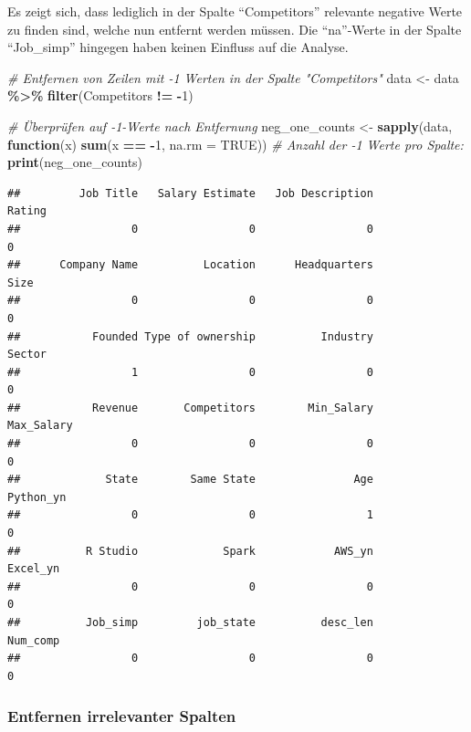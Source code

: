\documentclass[
]{article}
\newenvironment{Shaded}{\begin{snugshade}}{\end{snugshade}}
\newcommand{\AttributeTok}[1]{\textcolor[rgb]{0.13,0.29,0.53}{#1}}
\newcommand{\CommentTok}[1]{\textcolor[rgb]{0.56,0.35,0.01}{\textit{#1}}}
\newcommand{\ConstantTok}[1]{\textcolor[rgb]{0.56,0.35,0.01}{#1}}
\newcommand{\ControlFlowTok}[1]{\textcolor[rgb]{0.13,0.29,0.53}{\textbf{#1}}}
\newcommand{\DecValTok}[1]{\textcolor[rgb]{0.00,0.00,0.81}{#1}}
\newcommand{\FunctionTok}[1]{\textcolor[rgb]{0.13,0.29,0.53}{\textbf{#1}}}
\newcommand{\NormalTok}[1]{#1}
\newcommand{\OtherTok}[1]{\textcolor[rgb]{0.56,0.35,0.01}{#1}}
\newcommand{\SpecialCharTok}[1]{\textcolor[rgb]{0.81,0.36,0.00}{\textbf{#1}}}
\begin{document}
Es zeigt sich, dass lediglich in der Spalte ``Competitors'' relevante
negative Werte zu finden sind, welche nun entfernt werden müssen. Die
``na''-Werte in der Spalte ``Job\_simp'' hingegen haben keinen Einfluss
auf die Analyse.

\begin{Shaded}
\begin{Highlighting}[]
\CommentTok{\# Entfernen von Zeilen mit {-}1 Werten in der Spalte "Competitors"}
\NormalTok{data }\OtherTok{\textless{}{-}}\NormalTok{ data }\SpecialCharTok{\%\textgreater{}\%}
  \FunctionTok{filter}\NormalTok{(Competitors }\SpecialCharTok{!=} \SpecialCharTok{{-}}\DecValTok{1}\NormalTok{)}

\CommentTok{\# Überprüfen auf {-}1{-}Werte nach Entfernung}
\NormalTok{neg\_one\_counts }\OtherTok{\textless{}{-}} \FunctionTok{sapply}\NormalTok{(data, }\ControlFlowTok{function}\NormalTok{(x) }\FunctionTok{sum}\NormalTok{(x }\SpecialCharTok{==} \SpecialCharTok{{-}}\DecValTok{1}\NormalTok{, }\AttributeTok{na.rm =} \ConstantTok{TRUE}\NormalTok{))}
\CommentTok{\# Anzahl der {-}1 Werte pro Spalte:}
\FunctionTok{print}\NormalTok{(neg\_one\_counts)}
\end{Highlighting}
\end{Shaded}

\begin{verbatim}
##         Job Title   Salary Estimate   Job Description            Rating 
##                 0                 0                 0                 0 
##      Company Name          Location      Headquarters              Size 
##                 0                 0                 0                 0 
##           Founded Type of ownership          Industry            Sector 
##                 1                 0                 0                 0 
##           Revenue       Competitors        Min_Salary        Max_Salary 
##                 0                 0                 0                 0 
##             State        Same State               Age         Python_yn 
##                 0                 0                 1                 0 
##          R Studio             Spark            AWS_yn          Excel_yn 
##                 0                 0                 0                 0 
##          Job_simp         job_state          desc_len          Num_comp 
##                 0                 0                 0                 0
\end{verbatim}

\subsubsection{Entfernen irrelevanter
Spalten}\label{entfernen-irrelevanter-spalten}
\end{document}
